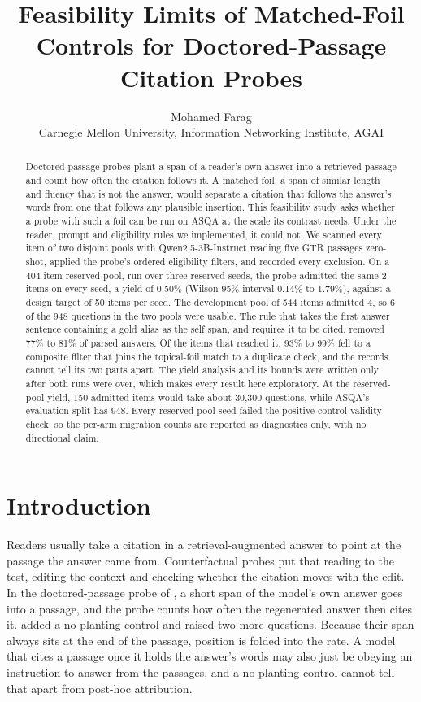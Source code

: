 \documentclass[11pt]{article}
\title{Feasibility Limits of Matched-Foil Controls for Doctored-Passage Citation Probes}
\author{Mohamed Farag \\
  Carnegie Mellon University, Information Networking Institute, AGAI}
\begin{document}
\maketitle

\begin{abstract}
Doctored-passage probes plant a span of a reader's own answer into a retrieved passage and count how often the citation follows it. A matched foil, a span of similar length and fluency that is not the answer, would separate a citation that follows the answer's words from one that follows any plausible insertion. This feasibility study asks whether a probe with such a foil can be run on ASQA at the scale its contrast needs. Under the reader, prompt and eligibility rules we implemented, it could not. We scanned every item of two disjoint pools with Qwen2.5-3B-Instruct reading five GTR passages zero-shot, applied the probe's ordered eligibility filters, and recorded every exclusion. On a 404-item reserved pool, run over three reserved seeds, the probe admitted the same 2 items on every seed, a yield of 0.50\% (Wilson 95\% interval 0.14\% to 1.79\%), against a design target of 50 items per seed. The development pool of 544 items admitted 4, so 6 of the 948 questions in the two pools were usable. The rule that takes the first answer sentence containing a gold alias as the self span, and requires it to be cited, removed 77\% to 81\% of parsed answers. Of the items that reached it, 93\% to 99\% fell to a composite filter that joins the topical-foil match to a duplicate check, and the records cannot tell its two parts apart. The yield analysis and its bounds were written only after both runs were over, which makes every result here exploratory. At the reserved-pool yield, 150 admitted items would take about 30,300 questions, while ASQA's evaluation split has 948. Every reserved-pool seed failed the positive-control validity check, so the per-arm migration counts are reported as diagnostics only, with no directional claim.
\end{abstract}

\section{Introduction}\label{introduction}

Readers usually take a citation in a retrieval-augmented answer \citep{lewis2020retrieval} to point at the passage the answer came from. Counterfactual probes put that reading to the test, editing the context and checking whether the citation moves with the edit. In the doctored-passage probe of \citet{wallat2025correctness}, a short span of the model's own answer goes into a passage, and the probe counts how often the regenerated answer then cites it. \citet{khan2026attributable} added a no-planting control and raised two more questions. Because their span always sits at the end of the passage, position is folded into the rate. A model that cites a passage once it holds the answer's words may also just be obeying an instruction to answer from the passages, and a no-planting control cannot tell that apart from post-hoc attribution.
\end{document}
